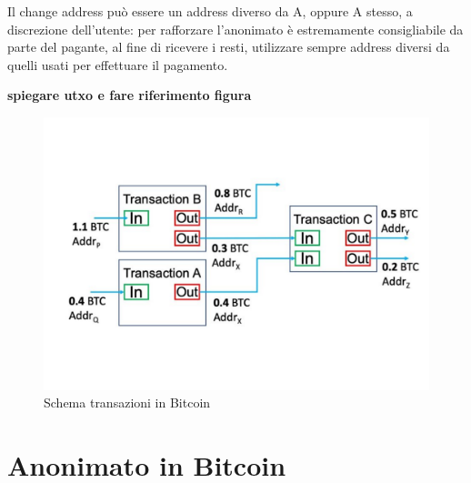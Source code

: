 Il change address può essere un address diverso da A, oppure A stesso, a discrezione dell’utente: per rafforzare l’anonimato è estremamente consigliabile da parte del pagante, al fine di ricevere i resti, utilizzare sempre address diversi da quelli usati per effettuare il pagamento.

\textbf{spiegare utxo e fare riferimento figura}
\begin{figure}[h!]
    \centering
    \includegraphics[scale=0.4, trim = 1cm 2cm 0cm 3cm, clip]{Images/Transactions-input-and-output-in-blockchain.jpg.pdf}
    \caption{Schema transazioni in Bitcoin}
    \label{fig:transaction}
\end{figure}
\FloatBarrier
\section{Anonimato in Bitcoin}\label{Anonimato}
\cite{de-anonimizzazione}


